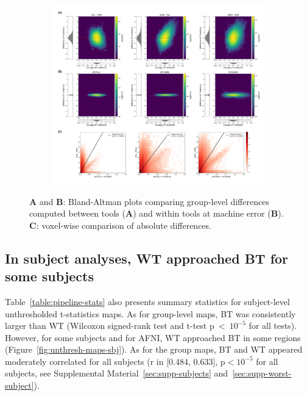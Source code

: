 \documentclass[11pt,onecolumn]{article}
\begin{document}
\begin{figure}[ht]
  \centering
  \begin{subfigure}[ht]{.9\textwidth}
    \centering
    \includegraphics[width=.9\textwidth]{figures/gl-unthresh.png}
  \end{subfigure}
  \caption{\textbf{A} and \textbf{B}: Bland-Altman plots comparing group-level differences computed between tools
    (\textbf{A}) and within tools at machine error (\textbf{B}). \textbf{C}: voxel-wise comparison of absolute differences.}
  \label{fig:unthresh-maps}
\end{figure}


\subsection{In subject analyses, WT approached BT for some subjects}

Table~\ref{table:pipeline-stats} also presents summary statistics for
subject-level unthresholded t-statistics maps. As for group-level maps,
BT was consistently larger than WT (Wilcoxon
signed-rank test and t-test p~\textless~$10^{-5}$ for all tests).
However, for
some subjects and for AFNI, WT approached 
BT in some regions (Figure~\ref{fig:unthresh-maps-sbj}). As for the group maps, BT and WT
 appeared moderately correlated for all subjects (r in [0.484,
    0.633], p$< 10^{-5}$ for all subjects, see Supplemental Material~\ref{sec:supp-subjects} and~\ref{sec:supp-worst-subject}).
\end{document}
